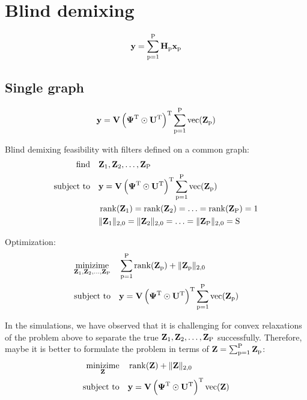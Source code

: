 \documentclass{article}
\newcommand{\numSources}{\text{P}}
\newcommand{\sourceIndex}{\text{p}}
\DeclareMathOperator{\vect}{vec}
\DeclareMathOperator{\rank}{rank}
\begin{document}
\section*{Blind demixing}

\begin{equation}
  \bby = \sum_{\sourceIndex=1}^{\numSources} \bbH_{\sourceIndex} \bbx_{\sourceIndex}
\end{equation}

\subsection*{Single graph}

\begin{equation}
  \bby = \bbV \left(\bbPsi^{\rmT} \odot \bbU^{\rmT} \right)^{\rmT}\sum_{\sourceIndex=1}^{\numSources} \vect(\bbZ_{\sourceIndex})
\end{equation}

Blind demixing feasibility with filters defined on a common graph:
\begin{align}
  \mathop{\text{find}} \quad & \bbZ_{1}, \bbZ_{2}, \ldots, \bbZ_{\numSources} \\
  \text{subject to} \quad & \bby = \bbV \left(\bbPsi^{\rmT} \odot \bbU^{\rmT} \right)^{\rmT}\sum_{\sourceIndex=1}^{\numSources} \vect(\bbZ_{\sourceIndex}) \nonumber \\
  & \rank(\bbZ_{1}) = \rank(\bbZ_{2}) = \ldots = \rank(\bbZ_{\numSources}) = 1 \nonumber \\
  & \|\bbZ_{1}\|_{2,0} = \|\bbZ_{2}\|_{2,0} = \ldots = \|\bbZ_{\numSources}\|_{2,0} = \rmS \nonumber
\end{align}

Optimization:
\begin{align}
  \mathop{\text{minizime}}_{\bbZ_{1},\bbZ_{2},\ldots,\bbZ_{\numSources}} \quad & \sum_{\sourceIndex=1}^{\numSources} \rank(\bbZ_{\sourceIndex}) + \|\bbZ_{\sourceIndex}\|_{2,0} \\
  \text{subject to} \quad & \bby = \bbV \left(\bbPsi^{\rmT} \odot \bbU^{\rmT} \right)^{\rmT}\sum_{\sourceIndex=1}^{\numSources} \vect(\bbZ_{\sourceIndex}) \nonumber
\end{align}

In the simulations, we have observed that it is challenging for convex relaxations of the problem above to separate the true $\bbZ_{1},\bbZ_{2},\ldots,\bbZ_{\numSources}$ successfully. Therefore, maybe it is better to formulate the problem in terms of $\bbZ = \sum_{\sourceIndex=1}^{\numSources} \bbZ_{\sourceIndex}$:
\begin{align}
  \mathop{\text{minizime}}_{\bbZ} \quad & \rank(\bbZ) + \|\bbZ\|_{2,0} \\
  \text{subject to} \quad & \bby = \bbV \left(\bbPsi^{\rmT} \odot \bbU^{\rmT} \right)^{\rmT} \vect(\bbZ) \nonumber
\end{align}
\end{document}

